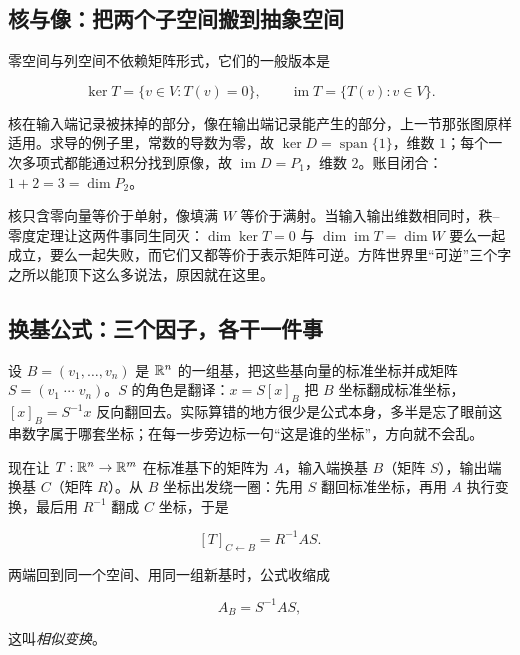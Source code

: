 \subsection{核与像：把两个子空间搬到抽象空间}

零空间与列空间不依赖矩阵形式，它们的一般版本是

\[
\ker T=\{v\in V:T(v)=0\},\qquad
\operatorname{im}T=\{T(v):v\in V\}.
\]

核在输入端记录被抹掉的部分，像在输出端记录能产生的部分，上一节那张图原样适用。求导的例子里，常数的导数为零，故 \(\ker D=\operatorname{span}\{1\}\)，维数 \(1\)；每个一次多项式都能通过积分找到原像，故 \(\operatorname{im}D=P_1\)，维数 \(2\)。账目闭合：\(1+2=3=\dim P_2\)。

核只含零向量等价于单射，像填满 \(W\) 等价于满射。当输入输出维数相同时，秩--零度定理让这两件事同生同灭：\(\dim\ker T=0\) 与 \(\dim\operatorname{im}T=\dim W\) 要么一起成立，要么一起失败，而它们又都等价于表示矩阵可逆。方阵世界里``可逆''三个字之所以能顶下这么多说法，原因就在这里。

\subsection{换基公式：三个因子，各干一件事}

设 \(B=(v_1,\ldots,v_n)\) 是 \(\mathbb{R}^n\) 的一组基，把这些基向量的标准坐标并成矩阵 \(S=(v_1\;\cdots\;v_n)\)。\(S\) 的角色是翻译：\(x=S[x]_B\) 把 \(B\) 坐标翻成标准坐标，\([x]_B=S^{-1}x\) 反向翻回去。实际算错的地方很少是公式本身，多半是忘了眼前这串数字属于哪套坐标；在每一步旁边标一句``这是谁的坐标''，方向就不会乱。

现在让 \(T:\mathbb{R}^n\to\mathbb{R}^m\) 在标准基下的矩阵为 \(A\)，输入端换基 \(B\)（矩阵 \(S\)），输出端换基 \(C\)（矩阵 \(R\)）。从 \(B\) 坐标出发绕一圈：先用 \(S\) 翻回标准坐标，再用 \(A\) 执行变换，最后用 \(R^{-1}\) 翻成 \(C\) 坐标，于是

\[
[T]_{C\leftarrow B}=R^{-1}AS .
\]

两端回到同一个空间、用同一组新基时，公式收缩成

\[
A_B=S^{-1}AS,
\]

这叫\emph{相似变换}。

